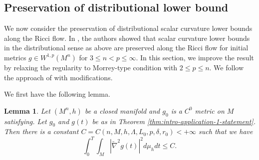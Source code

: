 \documentclass[12pt]{amsart}
\theoremstyle{plain}
\theoremstyle{plain}
\newtheorem{lemma}[subsection]{Lemma}
\theoremstyle{definition}
\theoremstyle{remark}
\numberwithin{equation}{subsection}
\newcommand{\hdel}{\tilde{\nabla}}
\begin{document}
\subsection{Preservation of distributional  lower bound}


We now consider the preservation of distributional scalar curvature lower bounds along the Ricci flow. In \cite{jiang_weak_2021}, the authors showed that scalar curvature lower bounds in the distributional sense as above are preserved along the Ricci flow for initial metrics $g \in W^{1,p}(M^n)$ for $3 \leq n < p \leq \infty$. In this section, we improve the result by relaxing the regularity to Morrey-type condition with $2 \leq p \leq n$. We follow the approach of \cite{jiang_weak_2021} with modifications.

We first have the following lemma.

\begin{lemma}\label{lem:hessiansquared-spacetime-integrability}
    Let $(M^n,h)$ be a closed manifold and $g_0$ is a $C^0$ metric on $M$ satisfying. Let $g_0$ and $g(t)$ be as in Theorem \ref{thm:intro-application-1-statement}. Then there is a constant $C = C(n, M,h, \Lambda, L_0, p, \delta,r_0) < +\infty$ such that we have
    \begin{equation*}
        \int_0^T \int_M |\hdel^2 g(t)|^2 d\mu_h dt \leq C.
    \end{equation*}
\end{lemma}
\end{document}
